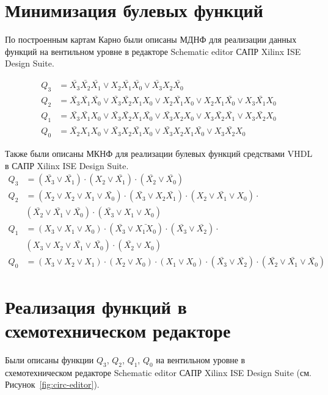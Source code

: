 \section{Минимизация булевых функций}
По построенным картам Карно были описаны {МДНФ} для реализации данных функций на вентильном уровне в редакторе Schematic editor САПР Xilinx ISE Design Suite.

\begin{align}
Q_3 &= \bar{X_3}\bar{X_2}\bar{X_1} \vee  X_2 \bar{X_1}\bar{X_0}  \vee \bar{X_3} X_2\bar{X_0} \\
Q_2 &= \bar{X_3} \bar{X_1} \bar{X_0} \vee \bar{X_3} \bar{X_2} X_1 X_0 \vee X_2  \bar{X_1}  X_0 \vee X_2  X_1  \bar{X_0} \vee  X_3  \bar{X_1}  X_0 \\
Q_1 &=  \bar{X_3}\bar{X_1}X_0    \vee  \bar{X_3} \bar{X_2} X_1 \bar{X_0} \vee     \bar{X_3} X_2  X_0  \vee  X_3 \bar{X_2} \bar{X_1}   \vee  X_3 \bar{X_2} X_0 \\
Q_0 &= \bar{X_2} X_1 X_0 \vee \bar{X_3} X_2 \bar{X_1} X_0 \vee \bar{X_3} X_2 X_1 \bar{X_0} \vee X_3 \bar{X_2} X_0
\end{align}

Также были описаны {МКНФ} для реализации булевых функций средствами VHDL в САПР Xilinx ISE Design Suite.
\begin{align}
Q_3 &=\left(
\bar{X_3}\vee \bar{X_1}
\right) 
\cdot 
\left(
X_2\vee \bar{X_1}
\right) 
\cdot  
\left(
\bar{X_2}\vee \bar{X_0}
\right) \\
Q_2 &= \left(
X_2 \vee X_2 \vee X_1 \vee \bar{X_0}
\right) 
\cdot 
\left( 
\bar{X_3} \vee X_2 \bar{X_1}
\right) 
\cdot 
\left(
X_2 \vee  \bar{X_1} \vee X_0
\right)
\cdot \\
& \left(
\bar{X_2}  \vee \bar{X_1} \vee \bar{X_0}
\right)
\cdot 
\left(\bar{X_3} \vee X_1 \vee X_0
\right)\\
Q_1 & = \left( X_3 \vee X_1 \vee X_0 \right) \cdot
\left( \bar{X_3} \vee \bar{X_1 X_0} \right) \cdot
\left( \bar{X_3} \vee \bar{X_2} \right) \cdot \\
& \left(X_3 \vee X_2 \vee \bar{X_1} \vee \bar{X_0}\right) \cdot
\left(\bar{X_2} \vee X_0\right)\\
Q_0 & = \left( X_3 \vee X_2 \vee X_1 \right) \cdot
\left(  X_2 \vee X_0 \right) \cdot
\left( X_1 \vee X_0  \right) \cdot
\left( \bar{X_3} \vee \bar{X_2} \right) \cdot
\left( \bar{X_2} \vee \bar{X_1} \vee \bar{X_0} \right)
\end{align}


\section{Реализация функций в схемотехническом редакторе}
Были описаны функции $Q_3$,  $Q_2$, $Q_1$,  $Q_0$ на вентильном уровне в схемотехническом редакторе Schematic editor САПР Xilinx ISE Design Suite (см. Рисунок~\ref{fig:circ-editor}).

